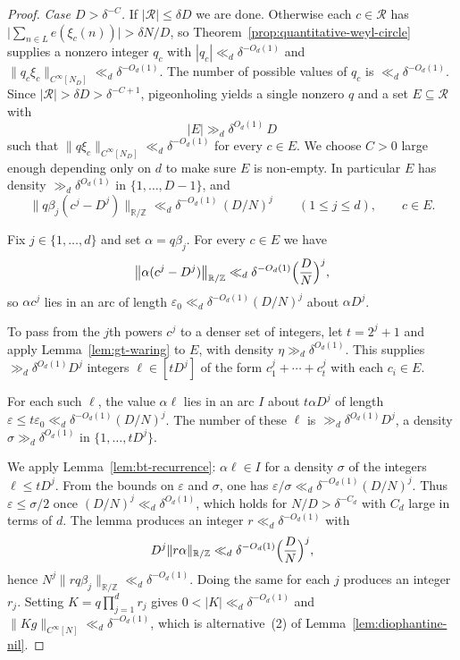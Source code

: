\begin{proof}
\smallskip\noindent\textit{Case \(D>\delta^{-C}\).}
If \(|\mathcal R|\le\delta D\) we are done.
Otherwise each \(c\in\mathcal R\) has
\(\bigl|\sum_{n\in L}e(\xi_c(n))\bigr|>\delta N/D\), so
Theorem~\ref{prop:quantitative-weyl-circle} supplies a nonzero integer \(q_c\) with
\(|q_c|\ll_d\delta^{-O_d(1)}\) and \(\|q_c\xi_c\|_{C^\infty[N_D]}\ll_d\delta^{-O_d(1)}\).
The number of possible values of \(q_c\) is \(\ll_d\delta^{-O_d(1)}\).
Since \(|\mathcal R|>\delta D>\delta^{-C+1}\), pigeonholing yields a single nonzero \(q\)
and a set \(E\subseteq\mathcal R\) with
\[
|E|\gg_d\delta^{O_d(1)}\,D
\]
such that \(\|q\xi_c\|_{C^\infty[N_D]}\ll_d\delta^{-O_d(1)}\) for every \(c\in E\).
We choose $C>0$ large enough depending only on $d$ to make sure $E$ is non-empty.
In particular \(E\) has density \(\gg_d\delta^{O_d(1)}\) in \(\{1,\ldots,D-1\}\), and
\[
\bigl\|q\beta_j(c^j-D^j)\bigr\|_{\mathbb R/\mathbb Z}
\ll_d\delta^{-O_d(1)}\,(D/N)^j
\qquad(1\leq j\leq d),\qquad c\in E.
\]

Fix \(j\in\{1,\ldots,d\}\) and set \(\alpha=q\beta_j\).  For every \(c\in E\) we have
\[
\bigl\|\alpha(c^j-D^j)\bigr\|_{\mathbb R/\mathbb Z}
\ll_d\delta^{-O_d(1)}\Bigl(\frac DN\Bigr)^j,
\]
so \(\alpha c^j\) lies in an arc of length
\(\varepsilon_0\ll_d\delta^{-O_d(1)}(D/N)^j\) about \(\alpha D^j\).

To pass from the \(j\)th powers \(c^j\) to a denser set of integers, let
\(t=2^j+1\) and apply Lemma~\ref{lem:gt-waring} to \(E\), with
density \(\eta\gg_d\delta^{O_d(1)}\).  This supplies
\(\gg_d\delta^{O_d(1)}D^j\) integers \(\ell\in[tD^j]\) of the form
\(c_1^j+\cdots+c_t^j\) with each \(c_i\in E\).

For each such \(\ell\), the value \(\alpha\ell\) lies in an arc \(I\) about
\(t\alpha D^j\) of length \(\varepsilon\le t\varepsilon_0\ll_d\delta^{-O_d(1)}(D/N)^j\).
The number of these \(\ell\) is \(\gg_d\delta^{O_d(1)}D^j\), a density
\(\sigma\gg_d\delta^{O_d(1)}\) in \(\{1,\ldots,tD^j\}\).

We apply Lemma~\ref{lem:bt-recurrence}: \(\alpha\ell\in I\) for a density
\(\sigma\) of the integers \(\ell\le tD^j\).  From the bounds on \(\varepsilon\) and \(\sigma\), one has \(\varepsilon/\sigma\ll_d\delta^{-O_d(1)}(D/N)^j\). Thus \(\varepsilon\le\sigma/2\) once \((D/N)^j\ll_d\delta^{O_d(1)}\), which holds for \(N/D>\delta^{-C_d}\) with \(C_d\) large in terms of \(d\).
The lemma produces an integer \(r\ll_d\delta^{-O_d(1)}\) with
\[
D^j\|r\alpha\|_{\mathbb R/\mathbb Z}
\ll_d\delta^{-O_d(1)}\Bigl(\frac DN\Bigr)^j,
\]
hence \(N^j\|rq\beta_j\|_{\mathbb R/\mathbb Z}\ll_d\delta^{-O_d(1)}\).  Doing the same for
each \(j\) produces an integer \(r_j\). Setting \(K=q\prod_{j=1}^d r_j\) gives
\(0<|K|\ll_d\delta^{-O_d(1)}\) and
\(\|Kg\|_{C^\infty[N]}\ll_d\delta^{-O_d(1)}\), which is
alternative~(2) of Lemma~\ref{lem:diophantine-nil}.
\end{proof}

